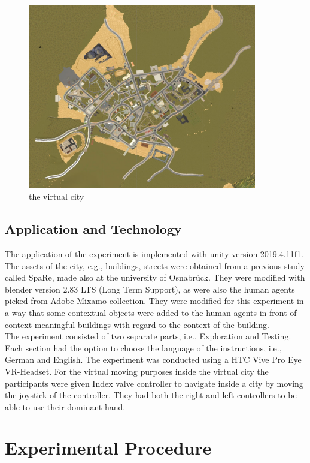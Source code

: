 \begin{figure}[h]
	\centering
	\includegraphics[width=100mm]{figures/city.jpg}
	\caption[The virtual city]{the virtual city}
	\label{fig:city}
\end{figure}

\subsection{Application and Technology}

The application of the experiment is implemented with unity version 2019.4.11f1. The assets of the city, e.g., buildings, streets were obtained from a previous study called SpaRe, made also at the university of Osnabrück. They were modified with blender version 2.83 LTS (Long Term Support), as were also the human agents picked from Adobe Mixamo collection. They were modified for this experiment in a way that some contextual objects were added to the human agents in front of context meaningful buildings with regard to the context of the building. \\
The experiment consisted of two separate parts, i.e., Exploration and Testing.  Each section had the option to choose the language of the instructions, i.e., German and English. The experiment was conducted using a HTC Vive Pro Eye VR-Headset. For the virtual moving purposes inside the virtual city the participants were given Index valve controller to navigate inside a city by moving the joystick of the controller. They had both the right and left controllers to be able to use their dominant hand.

\section{Experimental Procedure}

